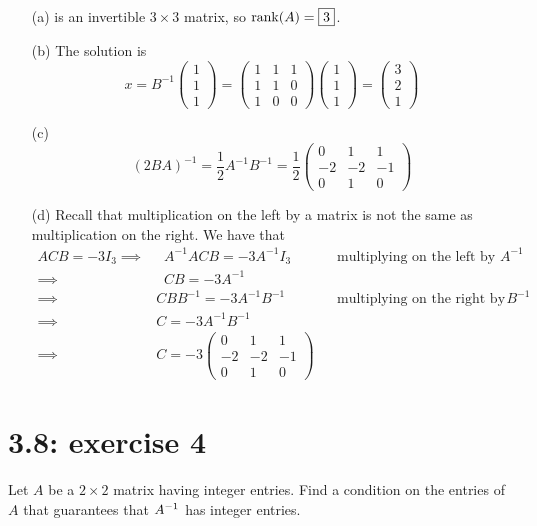 \documentclass{report}
\begin{document}
\begin{enumerate}
\item[(a)] is an invertible $3\times 3$ matrix, so $\operatorname{rank}(A)=\boxed{3}$.

\item[(b)] The solution is
\[
x = B^{-1}\begin{pmatrix} 1 \\ 1 \\ 1 \end{pmatrix}= \begin{pmatrix} 1 & 1 & 1 \\ 1 &1 &0 \\ 1 & 0 & 0 \end{pmatrix} \begin{pmatrix} 1 \\ 1 \\ 1 \end{pmatrix}=\boxed{\begin{pmatrix} 3 \\ 2 \\ 1 \end{pmatrix}}
\]

\item[(c)]
\[
(2BA)^{-1}=\frac{1}{2}A^{-1}B^{-1}=\boxed{\frac{1}{2}
\begin{pmatrix} 0 & 1 & 1 \\ -2 &-2 &-1 \\ 0 & 1 & 0 \end{pmatrix}}
\]

\item[(d)] Recall that multiplication on the left by a matrix is not the same as multiplication on the right. We have that
\begin{align*}
ACB=-3I_3\implies&\;\;  A^{-1}ACB=-3A^{-1}I_3 &&\text{multiplying on the left by $A^{-1}$}\\
\implies & \;\; CB=-3A^{-1}\\
\implies & CBB^{-1}=-3A^{-1}B^{-1}&&\text{multiplying on the right by $B^{-1}$}\\
\implies & C=-3A^{-1}B^{-1}\\
\implies & C=\boxed{-3\begin{pmatrix} 0 & 1 & 1 \\ -2 &-2 &-1 \\ 0 & 1 & 0 \end{pmatrix}}
\end{align*}
\end{enumerate}


\section*{3.8: exercise 4} 
Let $A$ be a $2\times 2$ matrix having integer entries.  Find a
condition on the entries of $A$ that guarantees that $A^{-1}$ has
integer entries.
\end{document}
